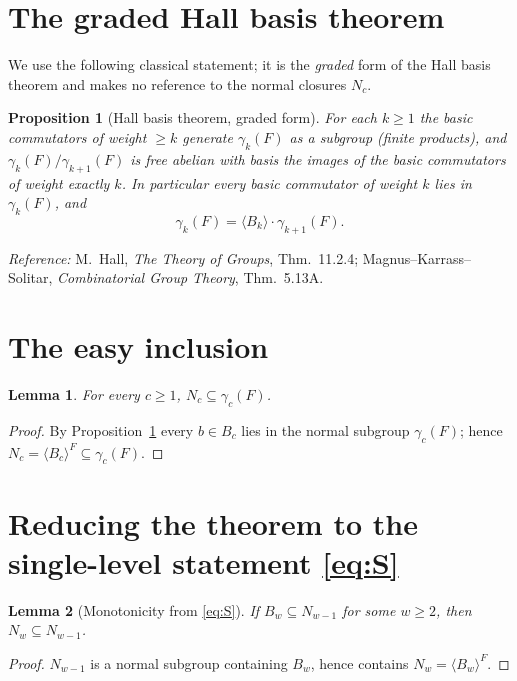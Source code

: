 \documentclass{amsart}
\newtheorem{lemma}{Lemma}
\newtheorem{proposition}{Proposition}
\theoremstyle{definition}
\theoremstyle{remark}
\begin{document}
\section{The graded Hall basis theorem}\label{sec:input}

We use the following classical statement; it is the \emph{graded} form of the Hall
basis theorem and makes no reference to the normal closures $N_c$.

\begin{proposition}[Hall basis theorem, graded form]\label{prop:hall}
For each $k\ge 1$ the basic commutators of weight $\ge k$ generate $\gamma_k(F)$
\emph{as a subgroup} \textup{(finite products)}, and $\gamma_k(F)/\gamma_{k+1}(F)$ is
free abelian with basis the images of the basic commutators of weight exactly $k$.
In particular every basic commutator of weight $k$ lies in $\gamma_k(F)$, and
\begin{equation}\label{eq:hall-decomp}
\gamma_k(F)=\langle B_k\rangle\cdot\gamma_{k+1}(F).
\end{equation}
\end{proposition}
\noindent\emph{Reference:} M.~Hall, \emph{The Theory of Groups}, Thm.~11.2.4;
Magnus--Karrass--Solitar, \emph{Combinatorial Group Theory}, Thm.~5.13A.

\section{The easy inclusion}\label{sec:easy}

\begin{lemma}\label{lem:easy}
For every $c\ge1$, $N_c\subseteq\gamma_c(F)$.
\end{lemma}
\begin{proof}
By Proposition~\ref{prop:hall} every $b\in B_c$ lies in the normal subgroup
$\gamma_c(F)$; hence $N_c=\langle B_c\rangle^{F}\subseteq\gamma_c(F)$.
\end{proof}

\section{Reducing the theorem to the single-level statement \eqref{eq:S}}
\label{sec:chain}

\begin{lemma}[Monotonicity from \eqref{eq:S}]\label{lem:mono}
If $B_w\subseteq N_{w-1}$ for some $w\ge2$, then $N_w\subseteq N_{w-1}$.
\end{lemma}
\begin{proof}
$N_{w-1}$ is a normal subgroup containing $B_w$, hence contains $N_w=\langle
B_w\rangle^{F}$.
\end{proof}
\end{document}
